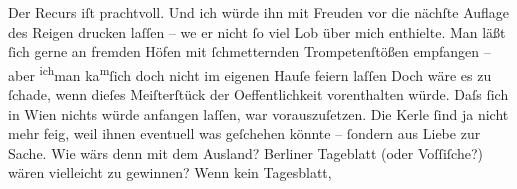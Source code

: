 \pstart
           Der Recurs iſt prachtvoll. Und ich würde ihn mit Freuden vor die nächſte {\pb}Auflage des Reigen drucken laſſen – we{\geminationn} er nicht ſo viel Lob über mich enthielte. Man läßt
               ſich gerne an fremden Höfen mit ſchmetternden Trompetenſtößen empfangen – aber \substVorne{}\textsuperscript{ich}\substDazwischen{}man\substHinten{} ka{\geminationn}\substVorne{}\textsuperscript{m}\substDazwischen{}ſ\substHinten{}ich doch nicht im eigenen Hauſe feiern laſſen{\dotstwo}
               Doch wäre es zu ſchade, wenn dieſes Meiſterſtück der Oeffentlichkeit vorenthalten
               würde. Daſs ſich in Wien nichts würde anfangen
               laſſen, war vorauszuſetzen. Die Kerle ſind ja nicht mehr feig, weil ihnen even{\pb}tuell was geſchehen
               könnte – ſondern aus Liebe zur Sache. Wie wärs denn mit dem Ausland? Berliner Tageblatt (oder Voſſiſche?) wären vielleicht zu gewinnen? Wenn kein Tagesblatt,
